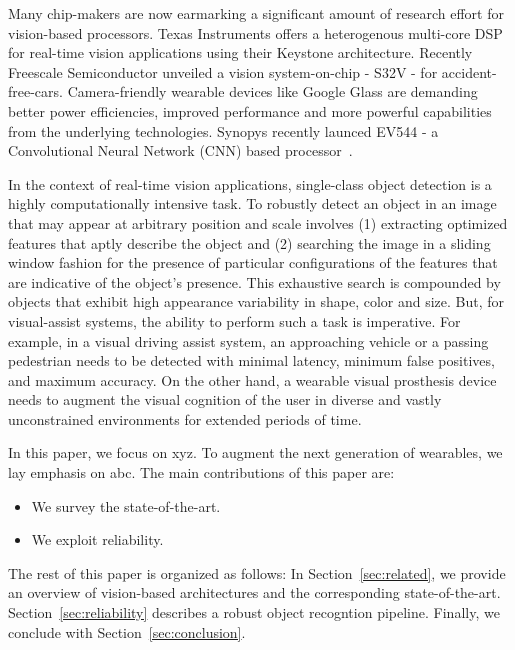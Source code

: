 
Many chip-makers are now earmarking a significant amount of research effort for 
vision-based processors. Texas Instruments offers a heterogenous multi-core DSP for real-time vision applications using their Keystone architecture. 
Recently Freescale Semiconductor unveiled a vision system-on-chip - S32V - for accident-free-cars. Camera-friendly wearable devices like Google Glass are 
demanding better power efficiencies, improved performance and more powerful capabilities from the underlying technologies. Synopys recently launced 
EV544 - a Convolutional Neural Network (CNN) based processor~\cite{syncnn}.

In the context of real-time vision applications, single-class object detection is a highly computationally intensive task.  
To robustly detect an object
in an image that may appear at arbitrary position and scale involves (1) extracting optimized features that aptly describe the object and (2) 
searching the image in a sliding window fashion for the presence of particular configurations of the features that are indicative of the object's presence. 
This exhaustive search is compounded by objects that exhibit high appearance variability in shape, color and size. 
But, for visual-assist systems, the ability to perform such a task is imperative. For example, in a visual driving
assist system, an approaching vehicle or a passing pedestrian needs to be detected
with minimal latency, minimum false positives, and maximum accuracy. On the other hand, a wearable visual prosthesis device needs to augment the visual cognition of the user 
in diverse and vastly unconstrained environments for extended periods of time.

In this paper, we focus on xyz.
To augment the next generation of wearables, we lay emphasis on abc.
The main contributions of this paper are:
\begin{itemize}
\item We survey the state-of-the-art. 
\item We exploit reliability. 
\end{itemize}

The rest of this paper is organized as follows:
In Section~\ref{sec:related}, we provide an overview of vision-based architectures and the corresponding state-of-the-art.
Section~\ref{sec:reliability} describes a robust object recogntion pipeline.
Finally, we conclude with Section~\ref{sec:conclusion}.


